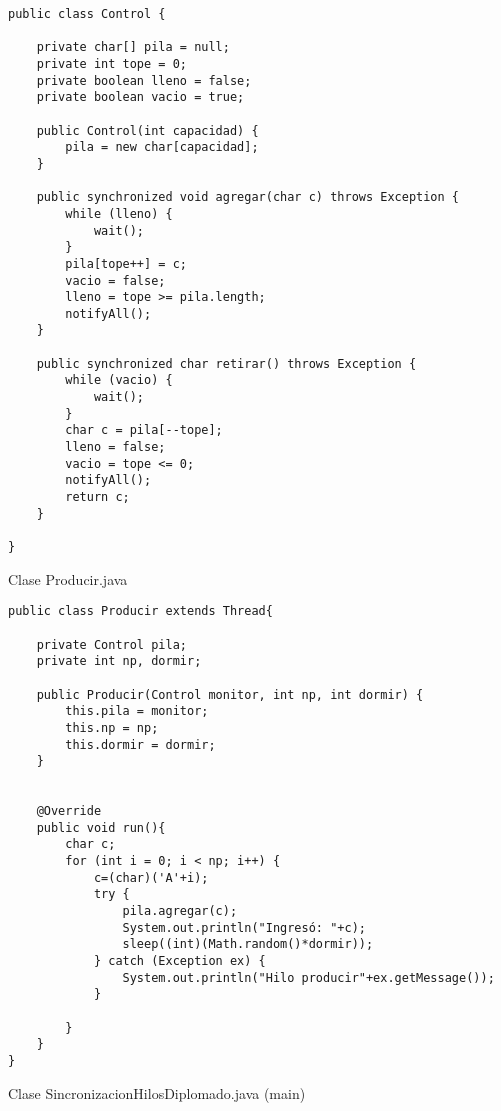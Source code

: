\begin{verbatim}
public class Control {

    private char[] pila = null;
    private int tope = 0;
    private boolean lleno = false;
    private boolean vacio = true;

    public Control(int capacidad) {
        pila = new char[capacidad];
    }

    public synchronized void agregar(char c) throws Exception {
        while (lleno) {
            wait();
        }
        pila[tope++] = c;
        vacio = false;
        lleno = tope >= pila.length;
        notifyAll();
    }

    public synchronized char retirar() throws Exception {
        while (vacio) {
            wait();
        }
        char c = pila[--tope];
        lleno = false;
        vacio = tope <= 0;
        notifyAll();
        return c;
    }

}
\end{verbatim} \vspace{1cm}

\begin{center}
Clase Producir.java
\end{center}

\begin{verbatim}
public class Producir extends Thread{
    
    private Control pila;
    private int np, dormir;

    public Producir(Control monitor, int np, int dormir) {
        this.pila = monitor;
        this.np = np;
        this.dormir = dormir;
    }
    
    
    @Override
    public void run(){
        char c;
        for (int i = 0; i < np; i++) {
            c=(char)('A'+i);
            try {
                pila.agregar(c);
                System.out.println("Ingresó: "+c);
                sleep((int)(Math.random()*dormir));
            } catch (Exception ex) {
                System.out.println("Hilo producir"+ex.getMessage());
            }
            
        }
    }
}
\end{verbatim} \vspace{1cm}

\begin{center}
Clase SincronizacionHilosDiplomado.java (main)
\end{center}

